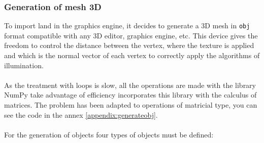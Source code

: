 \documentclass[10pt,a4paper,twocolumn,twoside]{article}
\begin{document}
\subsubsection{Generation of mesh 3D}
\label{mesh3d}
To import land in the graphics engine, it decides to generate a 3D mesh in {\tt obj} format compatible with any 3D editor, graphics engine, etc. This device gives the freedom to control the distance between the vertex, where the texture is applied and which is the normal vector of each vertex to correctly apply the algorithms of illumination.
\\
\\
As the treatment with loops is slow, all the operations are made with the library NumPy take advantage of efficiency incorporates this library with the calculus of matrices. The problem has been adapted to operations of matricial type, you can see the code in the annex \ref{appendix:generateobj}.
\\
\\
For the generation of objects four types of objects must be defined:
\end{document}
